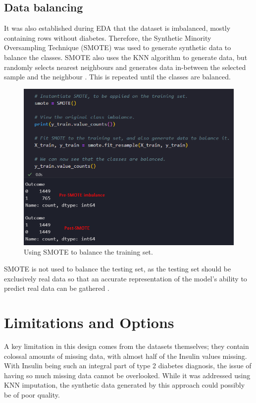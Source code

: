 \documentclass[12pt]{report}
\newcommand{\para}{\vspace{8pt}\noindent}
\begin{document}
\pagebreak

\subsection{Data balancing}
It was also established during EDA that the dataset is imbalanced, mostly containing rows without diabetes. Therefore,
the Synthetic Minority Oversampling Technique (SMOTE) was used to generate synthetic data to balance the classes. 
SMOTE also uses the KNN algorithm to generate data, but randomly selects nearest neighbours and generates data in-between
the selected sample and the neighbour \autocite{trainindata_overcoming_2023}. This is repeated until the classes are balanced.

\begin{figure}[H]
    \centering
    \includegraphics[width=.8\linewidth]{Preprocessing/SMOTE.png}
    \caption{Using SMOTE to balance the training set.}
    \label{fig:SMOTE}
\end{figure}

\para SMOTE is not used to balance the testing set, as the testing set should be exclusively real data
so that an accurate representation of the model's ability to predict real data can be gathered \autocite{ozbun_properly_2021}.



\section{Limitations and Options}
A key limitation in this design comes from the datasets themselves; they contain colossal amounts of missing data, 
with almost half of the Insulin values missing. With Insulin being such an integral part of type 2 diabetes diagnosis,
the issue of having so much missing data cannot be overlooked. While it was addressed using KNN imputation, the synthetic 
data generated by this approach could possibly be of poor quality.
\end{document}
